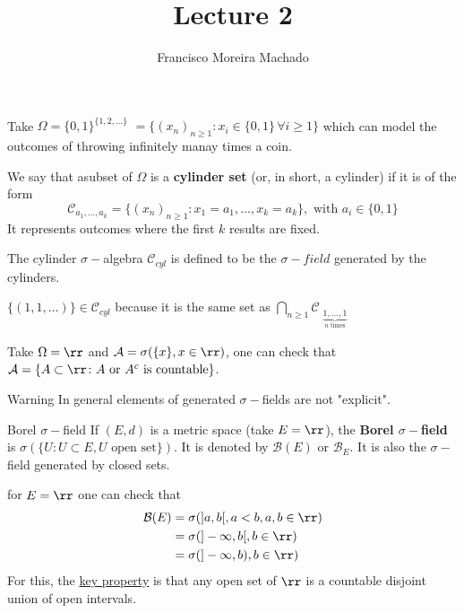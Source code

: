 \documentclass{scrartcl}
\author{Francisco Moreira Machado}
\title{Lecture 2}
\begin{document}
  \begin{example}
    Take $\Omega = \{ 0, 1 \}^{\{ 1,2, \ldots \} } $  $=\{(x_n)_{n \geq 1} \colon x_i \in \{
    0,1 \} \,\forall i \geq 1 \} $
    which can model the outcomes of throwing infinitely manay times a coin. 
  \end{example}
  \begin{definition}
    We say that  asubset of $\Omega$ is a \textbf{cylinder set} (or, in short, a cylinder)  if
    it is of the form 
    \[
      \mathcal{C}_{a_1, \ldots, a_k} = \{ (x_n)_{n \geq 1} \colon x_1 = a_1, \ldots, x_k = a_k
      \}, \text{ with } a_i \in \{ 0,1 \}
    \] 
    It represents outcomes where the first $k$ results are fixed.
  \end{definition}

  The cylinder $\sigma-$algebra $\mathcal{C}_{cyl}$ is defined to be the 
  $\sigma-field$ generated by the cylinders.

  \begin{example}
      $\{ (1, 1, \ldots) \}  \in \mathcal{C}_{cyl}$ because it is the same set as $\bigcap_{n
      \geq 1} \mathcal{C}_{\substack{ \underbrace{1, \ldots, 1}_{n \text{ times}}}}$
  \end{example}

  \begin{example}
    Take $\Omega = \rr$ and $\mathcal{A} = \sigma(\{ x \}, x \in \rr)$, one can check that
    $\mathcal{A} = \{ A \subset \rr \colon A \text{ or } A^c \text{ is countable}\} $. 
  \end{example}
  {\color{red} Warning} In general elements of generated $\sigma-$fields are not "explicit".

  \begin{definition}
    {Borel $\sigma-$field}
    If $(E, d)$ is a metric space (take $E = \rr$), the \textbf{Borel $\sigma-$field} is 
    $\sigma(\{ U \colon U \subset E, U \text{ open set} \})$. It is denoted by $\mathcal{B}(E)$
    or $\mathcal{B}_E$. It is also the $\sigma-$field generated by closed sets.
  \end{definition}
  \begin{example}
      for $E = \rr$ one can check that
      \begin{align*}
        \mathcal{B}(E) &= \sigma(]a, b[, a < b, a, b \in \rr) \\
                       &= \sigma(]-\infty, b[, b \in \rr) \\
                       &= \sigma(]-\infty, b), b \in \rr) \\
      \end{align*}
      For this, the \underline{key property} is that any open set of $\rr$ is a countable
      disjoint union of open intervals.
  \end{example}
\end{document}
